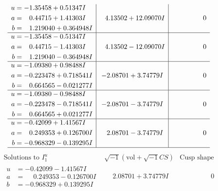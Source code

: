 \documentclass[1p]{elsarticle_modified}
\theoremstyle{definition}
\newcommand{\I}{\sqrt{-1}}
\begin{document}
$$\begin{array}{c|c|c}
\begin{aligned}
u &= -1.35458 + 0.51347 I \\
a &= \phantom{-}0.44715 + 1.41303 I \\
b &= \phantom{-}1.219040 + 0.364948 I\end{aligned}
 & \phantom{-}4.13502 + 12.09070 I & \phantom{-0.000000 } 0 \\ \hline\begin{aligned}
u &= -1.35458 - 0.51347 I \\
a &= \phantom{-}0.44715 - 1.41303 I \\
b &= \phantom{-}1.219040 - 0.364948 I\end{aligned}
 & \phantom{-}4.13502 - 12.09070 I & \phantom{-0.000000 } 0 \\ \hline\begin{aligned}
u &= -1.09380 + 0.98488 I \\
a &= -0.223478 + 0.718541 I \\
b &= \phantom{-}0.664565 - 0.021277 I\end{aligned}
 & -2.08701 + 3.74779 I & \phantom{-0.000000 } 0 \\ \hline\begin{aligned}
u &= -1.09380 - 0.98488 I \\
a &= -0.223478 - 0.718541 I \\
b &= \phantom{-}0.664565 + 0.021277 I\end{aligned}
 & -2.08701 - 3.74779 I & \phantom{-0.000000 } 0 \\ \hline\begin{aligned}
u &= -0.42099 + 1.41567 I \\
a &= \phantom{-}0.249353 + 0.126700 I \\
b &= -0.968329 - 0.139295 I\end{aligned}
 & \phantom{-}2.08701 - 3.74779 I & \phantom{-0.000000 } 0\\
 \hline 
 \end{array}$$\newpage$$\begin{array}{c|c|c}  
\text{Solutions to }I^u_{1}& \I (\text{vol} + \sqrt{-1}CS) & \text{Cusp shape}\\
 \hline 
\begin{aligned}
u &= -0.42099 - 1.41567 I \\
a &= \phantom{-}0.249353 - 0.126700 I \\
b &= -0.968329 + 0.139295 I\end{aligned}
 & \phantom{-}2.08701 + 3.74779 I & \phantom{-0.000000 } 0 \\ \hline\begin{aligned}

\end{aligned}
\end{array}$$
\end{document}
